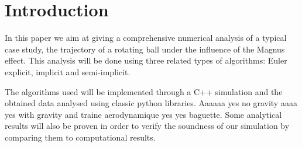 \section{Introduction}

In this paper we aim at giving a comprehensive numerical analysis of a typical case study, the trajectory of a rotating ball under the influence of the Magnus effect. This analysis will be done using three related types of algorithms: Euler explicit, implicit and semi-implicit.

The algorithms used will be implemented through a C++ simulation and the obtained data analysed using classic python libraries. Aaaaaa yes no gravity aaaa yes with gravity and traine aerodynamique yes yes baguette. %
Some analytical results will also be proven in order to verify the soundness of our simulation by comparing them to computational results.
